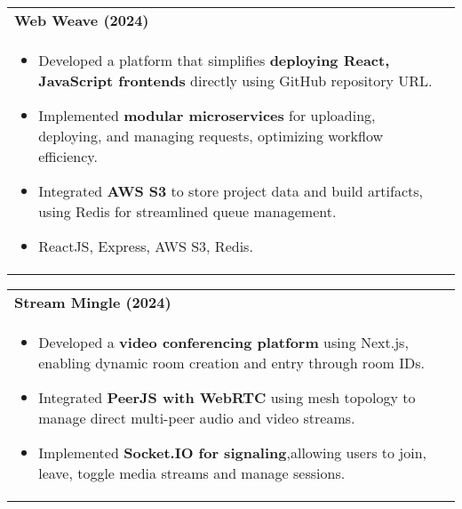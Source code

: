 \documentclass[a4paper,8pt]{article}
\begin{document}
\vspace{-2pt}

\begin{tabularx}{\linewidth}{ @{}l r@{} }
\textbf{{Web Weave (2024)}} \hfill \color[HTML]{371e77} \\[1pt]
\begin{minipage}[t]{\linewidth}
    \begin{itemize}[nosep,after=\strut, leftmargin=2em, itemsep=2pt]
        \item Developed a platform that simplifies \textbf{deploying React, JavaScript frontends} directly using GitHub repository URL.
        \item Implemented \textbf{modular microservices} for uploading, deploying, and managing requests, optimizing workflow efficiency.
        \item Integrated \textbf{AWS S3} to store project data and build artifacts, using Redis for streamlined queue management.
        \item ReactJS, Express, AWS S3, Redis.
\end{itemize}
\end{minipage}
\end{tabularx}

\vspace{-2pt}



\begin{tabularx}{\linewidth}{ @{}l r@{} }
\textbf{{ Stream Mingle (2024)}} \hfill \color[HTML]{371e77} \\[1pt]
\begin{minipage}[t]{\linewidth}
    \begin{itemize}[nosep,after=\strut, leftmargin=2em, itemsep=2pt]
        \item Developed a \textbf{video conferencing platform} using Next.js, enabling dynamic room creation and entry through room IDs. 
        \item Integrated \textbf{PeerJS with WebRTC} using mesh topology to manage direct multi-peer audio and video streams.
        \item  Implemented \textbf{Socket.IO for signaling},allowing users to join, leave, toggle media streams and manage sessions.
    \end{itemize}
\end{minipage}
\end{tabularx}

\vspace{-2pt}
\end{document}
